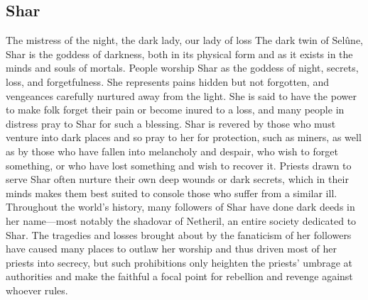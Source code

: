 \documentclass[10pt,a4paper,twoside,twocolumn,openany,bg=print,nodeprecatedcode]{dndbook}
\begin{document}
\subsection{Shar}
The mistress of the night, the dark lady, our lady of loss
The dark twin of Selûne, Shar is the goddess of darkness, both in its physical form and as it exists in the minds and souls of mortals. People worship Shar as the goddess of night, secrets, loss, and forgetfulness. She represents pains hidden but not forgotten, and vengeances carefully nurtured away from the light. She is said to have the power to make folk forget their pain or become inured to a loss, and many people in distress pray to Shar for such a blessing.
Shar is revered by those who must venture into dark places and so pray to her for protection, such as miners, as well as by those who have fallen into melancholy and despair, who wish to forget something, or who have lost something and wish to recover it. Priests drawn to serve Shar often nurture their own deep wounds or dark secrets, which in their minds makes them best suited to console those who suffer from a similar ill. Throughout the world's history, many followers of Shar have done dark deeds in her name—most notably the shadovar of Netheril, an entire society dedicated to Shar. The tragedies and losses brought about by the fanaticism of her followers have caused many places to outlaw her worship and thus driven most of her priests into secrecy, but such prohibitions only heighten the priests' umbrage at authorities and make the faithful a focal point for rebellion and revenge against whoever rules.
\end{document}
